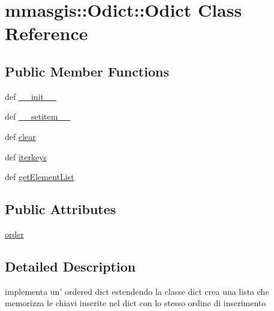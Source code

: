 \hypertarget{classmmasgis_1_1Odict_1_1Odict}{
\section{mmasgis::Odict::Odict Class Reference}
\label{classmmasgis_1_1Odict_1_1Odict}
}
\subsection*{Public Member Functions}
\begin{DoxyCompactItemize}
\item 
def \hyperlink{classmmasgis_1_1Odict_1_1Odict_a9969897d5f27dcb29d8752134299574a}{\_\-\_\-init\_\-\_\-}
\item 
def \hyperlink{classmmasgis_1_1Odict_1_1Odict_acf2818afbc291e8d2c67f866e6bbd5f8}{\_\-\_\-setitem\_\-\_\-}
\item 
def \hyperlink{classmmasgis_1_1Odict_1_1Odict_aa7740de76588e4546bd504a78610c2d8}{clear}
\item 
def \hyperlink{classmmasgis_1_1Odict_1_1Odict_af3017c77cf475524469f1c7ff421226c}{iterkeys}
\item 
def \hyperlink{classmmasgis_1_1Odict_1_1Odict_ab982708f6d838ab3577652255be1d60b}{getElementList}
\end{DoxyCompactItemize}
\subsection*{Public Attributes}
\begin{DoxyCompactItemize}
\item 
\hyperlink{classmmasgis_1_1Odict_1_1Odict_a447733cd53020057a0142f815bce318b}{order}
\end{DoxyCompactItemize}


\subsection{Detailed Description}
\begin{DoxyVerb}
implementa un' ordered dict estendendo la classe dict
crea una lista che memorizza le chiavi inserite nel dict  con lo stesso ordine di inserimento
\end{DoxyVerb}
 

